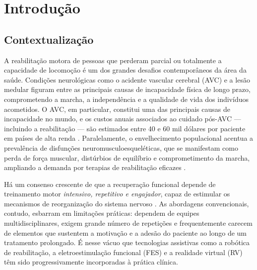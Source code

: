\chapter{Introdução}
\label{cap:introducao}

\section{Contextualização}

A reabilitação motora de pessoas que perderam parcial ou totalmente a capacidade
de locomoção é um dos grandes desafios contemporâneos da área da saúde. Condições
neurológicas como o acidente vascular cerebral (AVC) e a lesão medular figuram entre
as principais causas de incapacidade física de longo prazo, comprometendo a marcha,
a independência e a qualidade de vida dos indivíduos acometidos. O AVC, em particular,
constitui uma das principais causas de incapacidade no mundo, e os custos anuais
associados ao cuidado pós-AVC --- incluindo a reabilitação --- são estimados entre
40 e 60 mil dólares por paciente em países de alta renda \cite{rajashekar2024}.
Paralelamente, o envelhecimento populacional acentua a prevalência de disfunções
neuromusculoesqueléticas, que se manifestam como perda de força muscular, distúrbios
de equilíbrio e comprometimento da marcha, ampliando a demanda por terapias de
reabilitação eficazes \cite{loureiro2024}.

Há um consenso crescente de que a recuperação funcional depende de treinamento
motor \emph{intensivo, repetitivo e engajador}, capaz de estimular os mecanismos de
reorganização do sistema nervoso \cite{rajashekar2024}. As abordagens convencionais,
contudo, esbarram em limitações práticas: dependem de equipes multidisciplinares,
exigem grande número de repetições e frequentemente carecem de elementos que sustentem
a motivação e a adesão do paciente ao longo de um tratamento prolongado. É nesse vácuo
que tecnologias assistivas como a robótica de reabilitação, a eletroestimulação
funcional (FES) e a realidade virtual (RV) têm sido progressivamente incorporadas à
prática clínica.

